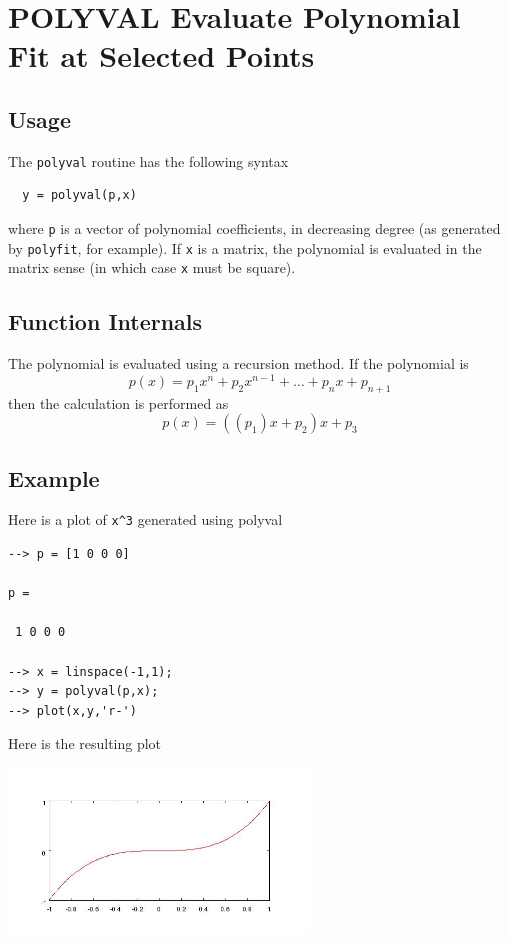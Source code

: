 \section{POLYVAL Evaluate Polynomial Fit at Selected Points}

\subsection{Usage}

The \verb|polyval| routine has the following syntax
\begin{verbatim}
  y = polyval(p,x)
\end{verbatim}
where \verb|p| is a vector of polynomial coefficients,
in decreasing degree (as generated by \verb|polyfit|, for example).
If \verb|x| is a matrix, the polynomial is evaluated in the matrix
sense (in which case \verb|x| must be square).
\subsection{Function Internals}

The polynomial is evaluated using a recursion method.  If the
polynomial is
\[
   p(x) = p_1 x^n + p_2 x^{n-1} + \dots + p_n x + p_{n+1}
\]
then the calculation is performed as
\[
   p(x) = ((p_1) x + p_2) x + p_3
\]
\subsection{Example}

Here is a plot of \verb|x^3| generated using polyval
\begin{verbatim}
--> p = [1 0 0 0]

p = 

 1 0 0 0 

--> x = linspace(-1,1);
--> y = polyval(p,x);
--> plot(x,y,'r-')
\end{verbatim}
Here is the resulting plot


\centerline{\includegraphics[width=8cm]{polyval1}}

